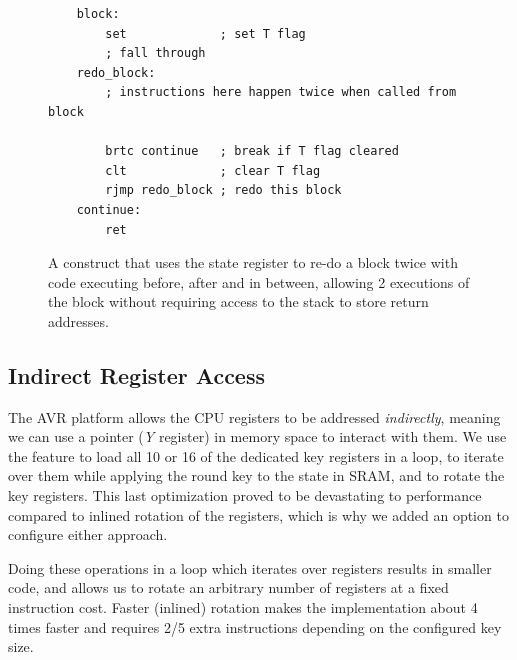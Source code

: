\documentclass[11pt]{llncs2e} %
\begin{document}
\begin{figure}[H]
\centering
	\begin{lstlisting}
	block:
		set             ; set T flag
		; fall through
	redo_block:
		; instructions here happen twice when called from block

		brtc continue   ; break if T flag cleared
		clt             ; clear T flag
		rjmp redo_block ; redo this block
	continue:
		ret
	\end{lstlisting}
	\caption{\footnotesize A construct that uses the state register to re-do a block twice with code executing before, after and in between, allowing 2 executions of the block without requiring access to the stack to store return addresses.}
\label{sreg_redo}
\end{figure}




\subsection{Indirect Register Access}
\label{indirect}
The AVR platform allows the CPU registers to be addressed \textit{indirectly}, meaning we can use a pointer (\textit{Y} register) in memory space to interact with them.
We use the feature to load all 10 or 16 of the dedicated key registers in a loop, to iterate over them while applying the round key to the state in SRAM, and to rotate the key registers.
This last optimization proved to be devastating to performance compared to inlined rotation of the registers, which is why we added an option to configure either approach.

Doing these operations in a loop which iterates over registers results in smaller code, and allows us to rotate an arbitrary number of registers at a fixed instruction cost.
Faster (inlined) rotation makes the implementation about 4 times faster and requires 2/5 extra instructions depending on the configured key size.
\end{document}
